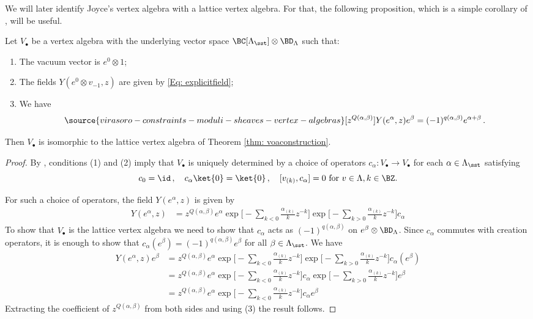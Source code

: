 We will later identify Joyce's vertex algebra with a lattice vertex algebra. For that, the following proposition, which is a simple corollary of \cite[Proposition 5.4]{Ka98}, will be useful.

\begin{proposition}
\notready
\label{Cor: calpha}
    Let $V_{\bullet}$ be a vertex algebra with the underlying vector space $\BC[\Lambda_{\sst}]\otimes \BD_{\Lambda}$ such that:
    \begin{enumerate}
    \item[(i)] The vacuum vector is $e^0\otimes 1$;
    \item[(ii)] The fields $Y(e^0\otimes v_{-1}, z)$ are given by \eqref{Eq: explicitfield};
    \item[(iii)] We have
        \begin{equation}
    \label{Eq: calpha}
\source{virasoro-constraints-moduli-sheaves-vertex-algebras}
    [z^{Q(\alpha,\beta)}] Y(e^{\alpha},z)e^{\beta}=(-1)^{q(\alpha, \beta)}e^{\alpha+\beta}\,.
    \end{equation}
    \end{enumerate}
Then $V_\bullet$ is isomorphic to the lattice vertex algebra of Theorem \ref{thm: voaconstruction}.
\end{proposition}
\begin{proof}
By \cite[Proposition 5.4]{Ka98}, conditions (1) and (2) imply that $V_\bullet$ is uniquely determined by a choice of operators $c_\alpha\colon V_\bullet\to V_\bullet$ for each $\alpha\in \Lambda_\sst$ satisfying
\[c_0=\id\,, \quad c_\alpha\ket{0}=\ket{0}\, , \quad [v_{(k)}, c_\alpha]=0\textup{ for }v\in \Lambda, k\in \BZ.\]

For such a choice of operators, the field $Y(e^\alpha, z)$ is given by
\begin{align*}
 Y(e^{\alpha},z) &=z^{Q(\alpha,\beta)}e^{\alpha} \exp\Big[-\sum_{ k<0}\frac{\alpha_{(k)}}{k}z^{-k}\Big]\exp\Big[-\sum_{k>0}\frac{\alpha_{(k)}}{k}z^{-k}\Big]c_\alpha
\end{align*}
To show that $V_\bullet$ is the lattice vertex algebra we need to show that $c_\alpha$ acts as $(-1)^{q(\alpha, \beta)}$ on $e^\beta\otimes \BD_\Lambda$. Since $c_\alpha$ commutes with creation operators, it is enough to show that $c_\alpha(e^\beta)=(-1)^{q(\alpha,\beta)}e^{\beta}$ for all $\beta\in \Lambda_\sst$.  We have
\begin{align*}
Y(e^\alpha, z)e^\beta&=z^{Q(\alpha,\beta)}e^{\alpha} \exp\Big[-\sum_{ k<0}\frac{\alpha_{(k)}}{k}z^{-k}\Big]\exp\Big[-\sum_{k>0}\frac{\alpha_{(k)}}{k}z^{-k}\Big]c_\alpha(e^\beta)\\
&=z^{Q(\alpha,\beta)}e^{\alpha} \exp\Big[-\sum_{ k<0}\frac{\alpha_{(k)}}{k}z^{-k}\Big]c_\alpha\exp\Big[-\sum_{k>0}\frac{\alpha_{(k)}}{k}z^{-k}\Big]e^\beta\\
&=z^{Q(\alpha,\beta)}e^{\alpha} \exp\Big[-\sum_{ k<0}\frac{\alpha_{(k)}}{k}z^{-k}\Big]c_\alpha e^\beta
\end{align*}
Extracting the coefficient of $z^{Q(\alpha, \beta)}$ from both sides and using (3) the result follows. \qedhere
\end{proof}

